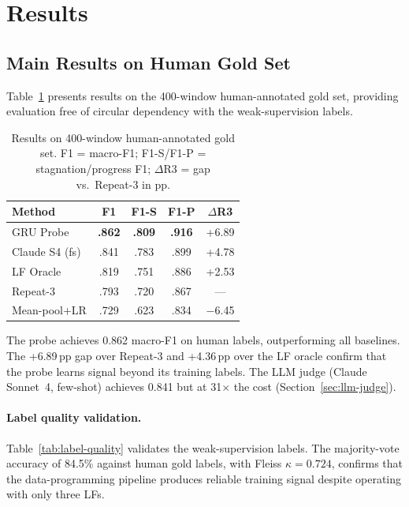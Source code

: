 \documentclass[11pt,a4paper]{article}
\begin{document}
\section{Results}

\subsection{Main Results on Human Gold Set}
\label{sec:gold}

Table~\ref{tab:gold} presents results on the 400-window human-annotated gold set, providing evaluation free of circular dependency with the weak-supervision labels.

\begin{table}[t]
\centering
\small
\begin{tabular}{lcccc}
\toprule
\textbf{Method} & \textbf{F1} & \textbf{F1-S} & \textbf{F1-P} & \textbf{$\Delta$R3} \\
\midrule
GRU Probe & \textbf{.862} & \textbf{.809} & \textbf{.916} & +6.89 \\
Claude S4 (fs) & .841 & .783 & .899 & +4.78 \\
LF Oracle & .819 & .751 & .886 & +2.53 \\
Repeat-3 & .793 & .720 & .867 & --- \\
Mean-pool+LR & .729 & .623 & .834 & $-$6.45 \\
\bottomrule
\end{tabular}
\caption{Results on 400-window human-annotated gold set. F1 = macro-F1; F1-S/F1-P = stagnation/progress F1; $\Delta$R3 = gap vs.\ Repeat-3 in pp.}
\label{tab:gold}
\end{table}

The probe achieves 0.862 macro-F1 on human labels, outperforming all baselines.
The +6.89\,pp gap over Repeat-3 and +4.36\,pp over the LF oracle confirm that the probe learns signal beyond its training labels.
The LLM judge (Claude Sonnet~4, few-shot) achieves 0.841 but at 31$\times$ the cost (Section~\ref{sec:llm-judge}).

\paragraph{Label quality validation.}
Table~\ref{tab:label-quality} validates the weak-supervision labels.
The majority-vote accuracy of 84.5\% against human gold labels, with Fleiss $\kappa=0.724$, confirms that the data-programming pipeline produces reliable training signal despite operating with only three LFs.
\end{document}
